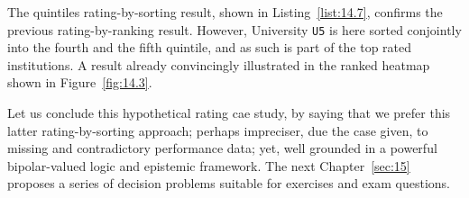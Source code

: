 The quintiles rating-by-sorting result, shown in Listing~\vref{list:14.7}, confirms the previous \Copeland rating-by-ranking result. However, University \texttt{U5} is here sorted conjointly into the fourth and the fifth quintile, and as such is part of the top rated institutions. A result already convincingly illustrated in the ranked heatmap shown in Figure~\vref{fig:14.3}. 

\vspace{\baselineskip}
Let us conclude this hypothetical rating cae study, by saying that we prefer this latter rating-by-sorting approach; perhaps impreciser, due the case given, to missing and contradictory performance data; yet, well grounded in a powerful bipolar-valued logic and epistemic framework. The next Chapter~\ref{sec:15} proposes a series of decision problems suitable for exercises and exam questions.
 
%



